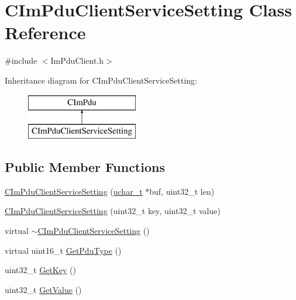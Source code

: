 \hypertarget{class_c_im_pdu_client_service_setting}{}\section{C\+Im\+Pdu\+Client\+Service\+Setting Class Reference}
\label{class_c_im_pdu_client_service_setting}


{\ttfamily \#include $<$Im\+Pdu\+Client.\+h$>$}

Inheritance diagram for C\+Im\+Pdu\+Client\+Service\+Setting\+:\begin{figure}[H]
\begin{center}
\leavevmode
\includegraphics[height=2.000000cm]{class_c_im_pdu_client_service_setting}
\end{center}
\end{figure}
\subsection*{Public Member Functions}
\begin{DoxyCompactItemize}
\item 
\hyperlink{class_c_im_pdu_client_service_setting_a4488d8c741712c577d55f43de2cc3592}{C\+Im\+Pdu\+Client\+Service\+Setting} (\hyperlink{base_2ostype_8h_a124ea0f8f4a23a0a286b5582137f0b8d}{uchar\+\_\+t} $\ast$buf, uint32\+\_\+t len)
\item 
\hyperlink{class_c_im_pdu_client_service_setting_a909fd3006d9eb1da97f472e65ee7d79f}{C\+Im\+Pdu\+Client\+Service\+Setting} (uint32\+\_\+t key, uint32\+\_\+t value)
\item 
virtual \hyperlink{class_c_im_pdu_client_service_setting_a43f2faefaef3cf62102139524a354900}{$\sim$\+C\+Im\+Pdu\+Client\+Service\+Setting} ()
\item 
virtual uint16\+\_\+t \hyperlink{class_c_im_pdu_client_service_setting_a0de276c8a47f710a79f731353944ade7}{Get\+Pdu\+Type} ()
\item 
uint32\+\_\+t \hyperlink{class_c_im_pdu_client_service_setting_ac7024ed487b937dc61c4c18aef1ae65a}{Get\+Key} ()
\item 
uint32\+\_\+t \hyperlink{class_c_im_pdu_client_service_setting_a9b5cad6378aac3c55345926ff6b3f34e}{Get\+Value} ()
\end{DoxyCompactItemize}
